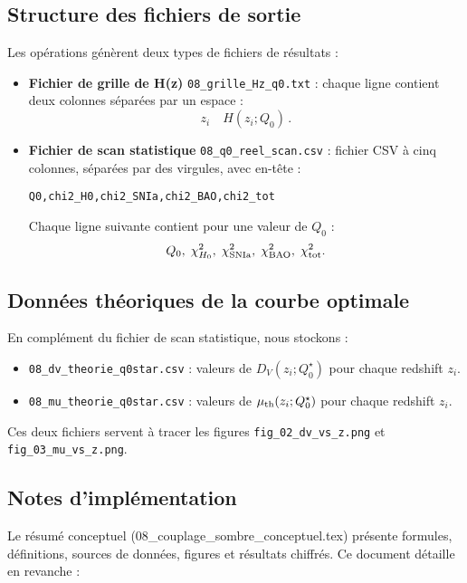 \subsection{Structure des fichiers de sortie}

Les opérations génèrent deux types de fichiers de résultats :

\begin{itemize}
  \item \textbf{Fichier de grille de H(z)}
    \texttt{08\_grille\_Hz\_q0.txt} : chaque ligne contient deux colonnes séparées par un espace :
    \[
      z_i
      \quad H(z_i;Q_{0})\,.
    \]

  \item \textbf{Fichier de scan statistique}
    \texttt{08\_q0\_reel\_scan.csv} : fichier CSV à cinq colonnes, séparées par des virgules, avec en-tête :
    \begin{verbatim}
Q0,chi2_H0,chi2_SNIa,chi2_BAO,chi2_tot
    \end{verbatim}
    Chaque ligne suivante contient pour une valeur de \(Q_{0}\) :
    \[
      Q_{0},\;\chi^{2}_{H_{0}},\;\chi^{2}_{\rm SNIa},\;\chi^{2}_{\rm BAO},\;\chi^{2}_{\rm tot}.
    \]
\end{itemize}

\subsection*{Données théoriques de la courbe optimale}

En complément du fichier de scan statistique, nous stockons :
\begin{itemize}
  \item \texttt{08\_dv\_theorie\_q0star.csv} : valeurs de \(D_V(z_i;Q_0^\star)\) pour chaque redshift \(z_i\).
  \item \texttt{08\_mu\_theorie\_q0star.csv} : valeurs de \(\mu_{\rm th}(z_i;Q_0^\star)\) pour chaque redshift \(z_i\).
\end{itemize}

Ces deux fichiers servent à tracer les figures
\texttt{fig\_02\_dv\_vs\_z.png} et \texttt{fig\_03\_mu\_vs\_z.png}.

\subsection{Notes d’implémentation}

Le résumé conceptuel (08\_couplage\_sombre\_conceptuel.tex) présente formules, définitions, sources de données, figures et résultats chiffrés.
Ce document détaille en revanche :

